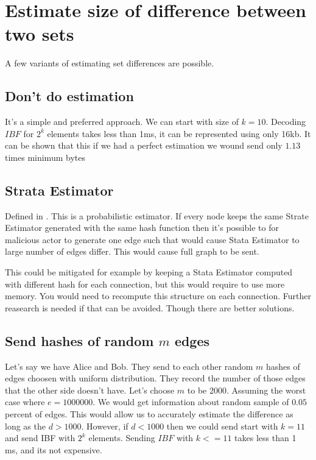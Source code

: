 \documentclass[11pt]{article}
\begin{document}
\section{Estimate size of difference between two sets}\label{sec:estimate}
A few variants of estimating set differences are possible.
\subsection{Don't do estimation}
It's a simple and preferred approach.
We can start with size of $k = 10$. Decoding $IBF$ for $2^k$ elements takes less than 1ms, it can be represented using only 16kb.
It can be shown that this if we had a perfect estimation we wound send only $1.13$ times minimum bytes

\subsection{Strata Estimator}
Defined in \cite{esrwpc}.
This is a probabilistic estimator. If every node keeps the same Strate Estimator generated with the same hash function then it's possible to for malicious actor to generate one edge such that would cause Stata Estimator to large number of edges differ. This would cause full graph to be sent.

This could be mitigated for example by keeping a Stata Estimator computed with different hash for each connection, but this would require to use more memory.
You would need to recompute this structure on each connection.
Further reasearch is needed if that can be avoided. Though there are better solutions.
\subsection{Send hashes of random $m$ edges}
Let's say we have Alice and Bob.
They send to each other random $m$ hashes  of edges choosen with uniform distribution.
They record the number of those edges that the other side doesn't have.
Let's choose $m$ to be $2000$.
Assuming the worst case where $e = 1000000$. We would get information about random sample of $0.05$ percent of edges.
This would allow us to accurately estimate the difference as long as the $d > 1000$.
However, if $d < 1000$ then we could send start with $k = 11$ and send IBF with $2^k$ elements.
Sending $IBF$ with $k <= 11$ takes less than 1 ms, and its not expensive.
\end{document}
